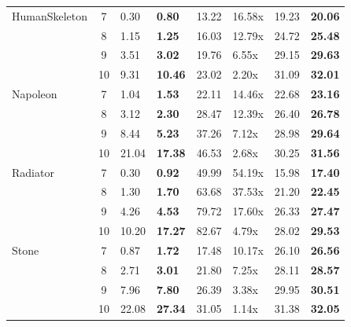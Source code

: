 \begin{table}[htbp]
\begin{tabular}{lcp{1cm}p{2cm}p{2cm}lp{2cm}p{2cm}}
    \midrule
    HumanSkeleton & 7 & 0.30 & \textbf{0.80} & 13.22 & 16.58x & 19.23 & \textbf{20.06} \\
     & 8 & 1.15 & \textbf{1.25} & 16.03 & 12.79x & 24.72 & \textbf{25.48} \\
     & 9 & 3.51 & \textbf{3.02} & 19.76 & 6.55x & 29.15 & \textbf{29.63} \\
     & 10 & 9.31 & \textbf{10.46} & 23.02 & 2.20x & 31.09 & \textbf{32.01} \\
    \midrule
    Napoleon & 7 & 1.04 & \textbf{1.53} & 22.11 & 14.46x & 22.68 & \textbf{23.16} \\
     & 8 & 3.12 & \textbf{2.30} & 28.47 & 12.39x & 26.40 & \textbf{26.78} \\
     & 9 & 8.44 & \textbf{5.23} & 37.26 & 7.12x & 28.98 & \textbf{29.64} \\
     & 10 & 21.04 & \textbf{17.38} & 46.53 & 2.68x & 30.25 & \textbf{31.56} \\
    \midrule
    Radiator & 7 & 0.30 & \textbf{0.92} & 49.99 & 54.19x & 15.98 & \textbf{17.40} \\
     & 8 & 1.30 & \textbf{1.70} & 63.68 & 37.53x & 21.20 & \textbf{22.45} \\
     & 9 & 4.26 & \textbf{4.53} & 79.72 & 17.60x & 26.33 & \textbf{27.47} \\
     & 10 & 10.20 & \textbf{17.27} & 82.67 & 4.79x & 28.02 & \textbf{29.53} \\
    \midrule
    Stone & 7 & 0.87 & \textbf{1.72} & 17.48 & 10.17x & 26.10 & \textbf{26.56} \\
     & 8 & 2.71 & \textbf{3.01} & 21.80 & 7.25x & 28.11 & \textbf{28.57} \\
     & 9 & 7.96 & \textbf{7.80} & 26.39 & 3.38x & 29.95 & \textbf{30.51} \\
     & 10 & 22.08 & \textbf{27.34} & 31.05 & 1.14x & 31.38 & \textbf{32.05} \\
    \bottomrule
  \end{tabular}
\end{table}
